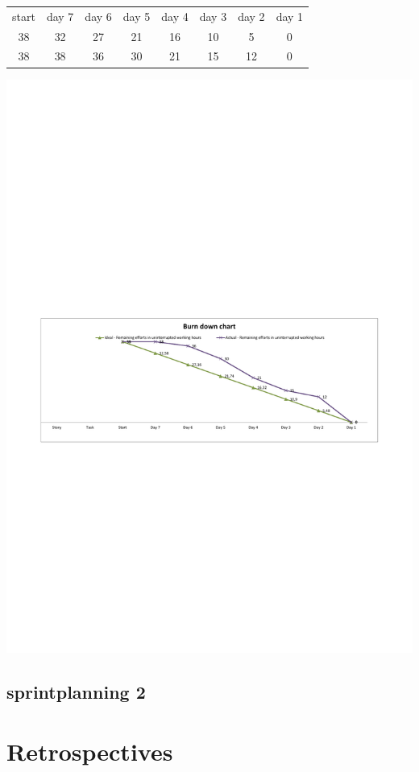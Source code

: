 \documentclass[12pt, a4paper]{extarticle}
\begin{document}
	\begin{center}
	\begin{tabular}{ |c|c|c|c|c|c|c|c| } 
		\hline
		start & day 7 & day 6 & day 5 & day 4& day 3 & day 2 & day 1 \\ 
		38 & 32 & 27 & 21 & 16 & 10 & 5 & 0 \\
		38 & 38 & 36 & 30 & 21 & 15 & 12 & 0 \\
	    \hline
	\end{tabular}
	\end{center}
	\includegraphics[scale=0.4]{burndownchart}
	\newpage
	\subsection{sprintplanning 2}

  
    
	
	\newpage
	\section{Retrospectives}
\end{document}
